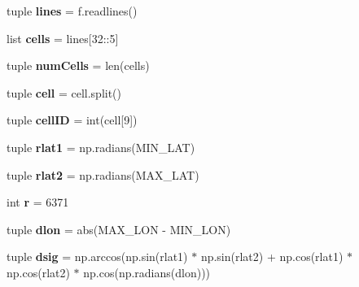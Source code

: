 \begin{DoxyCompactItemize}
\item 
\hypertarget{namespacebest__track_a38354515a520c4f79120177dbde2a05a}{tuple {\bfseries lines} = f.\-readlines()}\label{namespacebest__track_a38354515a520c4f79120177dbde2a05a}

\item 
\hypertarget{namespacebest__track_aa19b56226815fd88d1cc45b637ad2a85}{list {\bfseries cells} = lines\mbox{[}32\-::5\mbox{]}}\label{namespacebest__track_aa19b56226815fd88d1cc45b637ad2a85}

\item 
\hypertarget{namespacebest__track_a26998d6bb2a3a38fc849927bb08c20bb}{tuple {\bfseries num\-Cells} = len(cells)}\label{namespacebest__track_a26998d6bb2a3a38fc849927bb08c20bb}

\item 
\hypertarget{namespacebest__track_a348a698667e2b4bc95dd077dea2ed950}{tuple {\bfseries cell} = cell.\-split()}\label{namespacebest__track_a348a698667e2b4bc95dd077dea2ed950}

\item 
\hypertarget{namespacebest__track_a7e8ca8180905f84ed1efdd03a8b9ee59}{tuple {\bfseries cell\-I\-D} = int(cell\mbox{[}9\mbox{]})}\label{namespacebest__track_a7e8ca8180905f84ed1efdd03a8b9ee59}

\item 
\hypertarget{namespacebest__track_a761777735bd7f69e5209f504e9a29091}{tuple {\bfseries rlat1} = np.\-radians(M\-I\-N\-\_\-\-L\-A\-T)}\label{namespacebest__track_a761777735bd7f69e5209f504e9a29091}

\item 
\hypertarget{namespacebest__track_a02f33965c52d3a103980046e92f12945}{tuple {\bfseries rlat2} = np.\-radians(M\-A\-X\-\_\-\-L\-A\-T)}\label{namespacebest__track_a02f33965c52d3a103980046e92f12945}

\item 
\hypertarget{namespacebest__track_a11240cf571359982cbebcdce38208efd}{int {\bfseries r} = 6371}\label{namespacebest__track_a11240cf571359982cbebcdce38208efd}

\item 
\hypertarget{namespacebest__track_a72a0c37e3d8f971a7055e50fe1e166f4}{tuple {\bfseries dlon} = abs(M\-A\-X\-\_\-\-L\-O\-N -\/ M\-I\-N\-\_\-\-L\-O\-N)}\label{namespacebest__track_a72a0c37e3d8f971a7055e50fe1e166f4}

\item 
\hypertarget{namespacebest__track_ab27e08263eb9b2be8acdd5ec80415725}{tuple {\bfseries dsig} = np.\-arccos(np.\-sin(rlat1) $\ast$ np.\-sin(rlat2) + np.\-cos(rlat1) $\ast$ np.\-cos(rlat2) $\ast$ np.\-cos(np.\-radians(dlon)))}\label{namespacebest__track_ab27e08263eb9b2be8acdd5ec80415725}


\end{DoxyCompactItemize}
